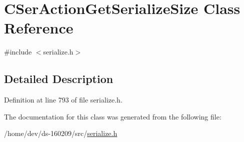 \hypertarget{class_c_ser_action_get_serialize_size}{}\section{C\+Ser\+Action\+Get\+Serialize\+Size Class Reference}
\label{class_c_ser_action_get_serialize_size}


{\ttfamily \#include $<$serialize.\+h$>$}



\subsection{Detailed Description}


Definition at line 793 of file serialize.\+h.



The documentation for this class was generated from the following file\+:\begin{DoxyCompactItemize}
\item 
/home/dev/ds-\/160209/src/\hyperlink{serialize_8h}{serialize.\+h}\end{DoxyCompactItemize}
